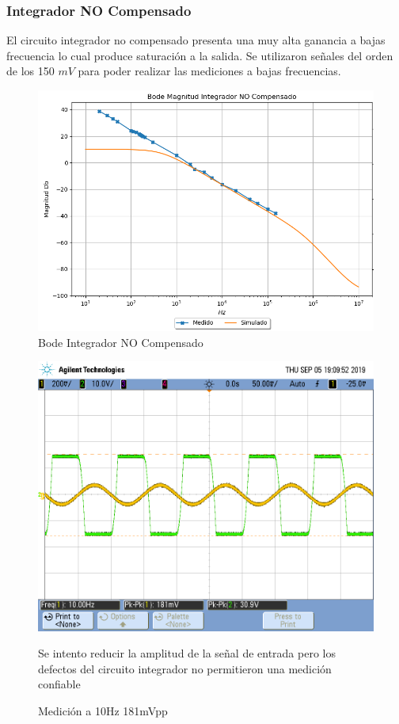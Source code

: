 \subsubsection{Integrador NO Compensado}
El circuito integrador no compensado presenta una muy alta ganancia a bajas frecuencia lo cual produce saturación a la salida. Se utilizaron señales del orden de los 150 $mV$ para poder realizar las mediciones a bajas frecuencias.
\begin{figure}[H]
	\centering
	\includegraphics[width=\textwidth]{Ejercicio4/SUPERPOSICION-BODE-INTEGRADOR-NO-COMPENSADO}
	\caption{Bode Integrador NO Compensado}
\end{figure}

\begin{figure}[H]
	\centering
	\includegraphics[width=\textwidth]{Ejercicio4/FOTOS-TP2-TC-EJ4/SaturaNoCompensado181mv}
	\caption{Medición a 10Hz 181mVpp}
Se intento reducir la amplitud de la señal de entrada pero los defectos del circuito integrador no permitieron una medición confiable
\end{figure}

